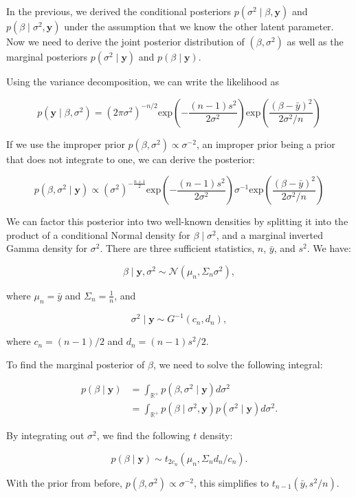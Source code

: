 In the previous, we derived the conditional posteriors $p(\sigma^2\mid\beta,\bm{y})$ and $p(\beta\mid\sigma^2,\bm{y})$ under the assumption that we know the other latent parameter. Now we need to derive the joint posterior distribution of $(\beta,\sigma^2)$ as well as the marginal posteriors $p(\sigma^2\mid\bm{y})$ and $p(\beta\mid\bm{y})$.

Using the variance decomposition, we can write the likelihood as 

\[
	p(\bm{y}\mid\beta,\sigma^2) = (2\pi\sigma^2)^{-n/2}\mathrm{exp}\left(-\frac{(n-1)s^2}{2\sigma^2}\right)\mathrm{exp}\left(\frac{(\beta-\bar{y})^2}{2\sigma^2/n}\right)
\]

If we use the improper prior $p(\beta,\sigma^2)\propto\sigma^{-2}$, an improper prior being a prior that does not integrate to one, we can derive the posterior:

\[
	p(\beta,\sigma^2\mid \bm{y}) \propto (\sigma^2)^{-\frac{n+1}{2}}\mathrm{exp}\left(-\frac{(n-1)s^2}{2\sigma^2}\right)\sigma^{-1}\mathrm{exp}\left(\frac{(\beta-\bar{y})^2}{2\sigma^2/n}\right)
\]

We can factor this posterior into two well-known densities by splitting it into the product of a conditional Normal density for $\beta\mid\sigma^2$, and a marginal inverted Gamma density for $\sigma^2$. There are three sufficient statistics, $n$, $\bar{y}$, and $s^2$. We have:

\[
	\beta\mid\bm{y},\sigma^2\sim\mathcal{N}(\mu_n,\Sigma_n\sigma^2),
\]

where $\mu_n = \bar{y}$ and $\Sigma_n = \frac{1}{n}$, and

\[
	\sigma^2\mid\bm{y}\sim G^{-1}(c_n,d_n),
\]

where $c_n = (n-1)/2$ and $d_n = (n-1)s^2/2$.

To find the marginal posterior of $\beta$, we need to solve the following integral:

\begin{align*}
	p(\beta\mid\bm{y}) &= \int_{\mathbb{R}^+}p(\beta,\sigma^2\mid\bm{y})d\sigma^2 \\
	&= \int_{\mathbb{R}^+}p(\beta\mid\sigma^2,\bm{y})p(\sigma^2\mid\bm{y})d\sigma^2.
\end{align*}

By integrating out $\sigma^2$, we find the following $t$ density:

\[
	p(\beta\mid\bm{y}) \sim t_{2c_n}(\mu_n,\Sigma_nd_n/c_n). 
\]

With the prior from before, $p(\beta,\sigma^2)\propto\sigma^{-2}$, this simplifies to $t_{n-1}(\bar{y},s^2/n)$. 

